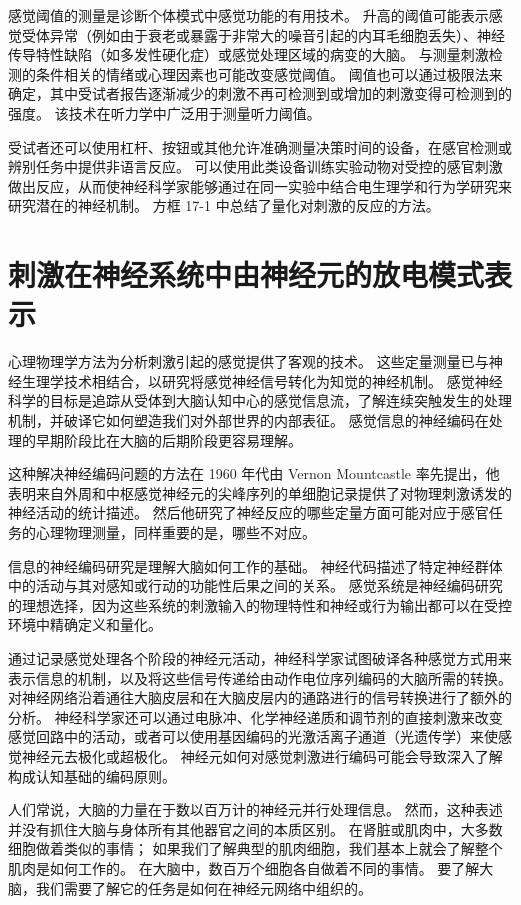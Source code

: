 感觉阈值的测量是诊断个体模式中感觉功能的有用技术。 
升高的阈值可能表示感觉受体异常（例如由于衰老或暴露于非常大的噪音引起的内耳毛细胞丢失）、神经传导特性缺陷（如多发性硬化症）或感觉处理区域的病变的大脑。
与测量刺激检测的条件相关的情绪或心理因素也可能改变感觉阈值。
阈值也可以通过极限法来确定，其中受试者报告逐渐减少的刺激不再可检测到或增加的刺激变得可检测到的强度。
该技术在听力学中广泛用于测量听力阈值。


受试者还可以使用杠杆、按钮或其他允许准确测量决策时间的设备，在感官检测或辨别任务中提供非语言反应。 
可以使用此类设备训练实验动物对受控的感官刺激做出反应，从而使神经科学家能够通过在同一实验中结合电生理学和行为学研究来研究潜在的神经机制。 方框 17-1 中总结了量化对刺激的反应的方法。



\section{刺激在神经系统中由神经元的放电模式表示}
心理物理学方法为分析刺激引起的感觉提供了客观的技术。 
这些定量测量已与神经生理学技术相结合，以研究将感觉神经信号转化为知觉的神经机制。 
感觉神经科学的目标是追踪从受体到大脑认知中心的感觉信息流，了解连续突触发生的处理机制，并破译它如何塑造我们对外部世界的内部表征。 
感觉信息的神经编码在处理的早期阶段比在大脑的后期阶段更容易理解。


这种解决神经编码问题的方法在 1960 年代由 Vernon Mountcastle 率先提出，他表明来自外周和中枢感觉神经元的尖峰序列的单细胞记录提供了对物理刺激诱发的神经活动的统计描述。 然后他研究了神经反应的哪些定量方面可能对应于感官任务的心理物理测量，同样重要的是，哪些不对应。


信息的神经编码研究是理解大脑如何工作的基础。
神经代码描述了特定神经群体中的活动与其对感知或行动的功能性后果之间的关系。 
感觉系统是神经编码研究的理想选择，因为这些系统的刺激输入的物理特性和神经或行为输出都可以在受控环境中精确定义和量化。


通过记录感觉处理各个阶段的神经元活动，神经科学家试图破译各种感觉方式用来表示信息的机制，以及将这些信号传递给由动作电位序列编码的大脑所需的转换。 
对神经网络沿着通往大脑皮层和在大脑皮层内的通路进行的信号转换进行了额外的分析。 
神经科学家还可以通过电脉冲、化学神经递质和调节剂的直接刺激来改变感觉回路中的活动，或者可以使用基因编码的光激活离子通道（光遗传学）来使感觉神经元去极化或超极化。 
神经元如何对感觉刺激进行编码可能会导致深入了解构成认知基础的编码原则。


人们常说，大脑的力量在于数以百万计的神经元并行处理信息。 
然而，这种表述并没有抓住大脑与身体所有其他器官之间的本质区别。 
在肾脏或肌肉中，大多数细胞做着类似的事情； 
如果我们了解典型的肌肉细胞，我们基本上就会了解整个肌肉是如何工作的。 
在大脑中，数百万个细胞各自做着不同的事情。 
要了解大脑，我们需要了解它的任务是如何在神经元网络中组织的。


